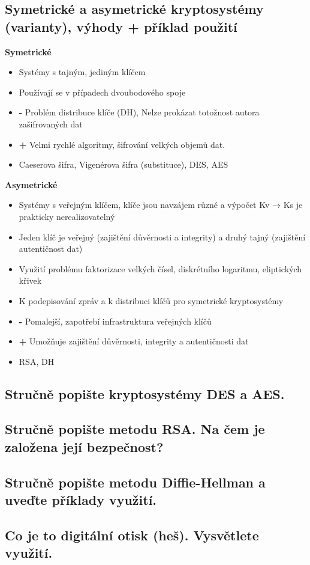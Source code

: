 \subsection{Symetrické a asymetrické kryptosystémy (varianty), výhody + příklad použití}
\textbf{Symetrické}
\begin{itemize}
    \item Systémy s tajným, jediným klíčem
    \item Používají se v případech dvoubodového spoje
    \item\textbf{  - }Problém distribuce klíče (DH), Nelze prokázat totožnost autora zašifrovaných dat
    \item\textbf{ + }Velmi rychlé algoritmy, šifrování velkých objemů dat.
    \item Caeserova šifra, Vigenérova šifra (substituce), DES, AES
\end{itemize}
\textbf{Asymetrické}
\begin{itemize}
    \item Systémy s veřejným klíčem, klíče jsou navzájem různé a výpočet Kv → Ks je prakticky nerealizovatelný
    \item Jeden klíč je veřejný (zajištění důvěrnosti a integrity)  a druhý tajný (zajištění autentičnost dat)
    \item Využití problému faktorizace velkých čísel, diskrétního logaritmu, eliptických křivek
    \item  K podepisování zpráv a k distribuci klíčů pro symetrické kryptosystémy
    \item\textbf{ - }Pomalejší, zapotřebí infrastruktura veřejných klíčů 
    \item\textbf{ + }Umožňuje zajištění důvěrnosti, integrity a autentičnosti dat 
    \item RSA, DH
\end{itemize}

\subsection{Stručně popište kryptosystémy DES a AES.}

\subsection{Stručně popište metodu RSA. Na čem je založena její bezpečnost?}

\subsection{Stručně popište metodu Diffie-Hellman a uveďte příklady využití.}

\subsection{Co je to digitální otisk (heš). Vysvětlete využití.}